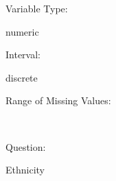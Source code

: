 \documentclass[
]{article}
\begin{document}
\begin{minipage}[t]{0.3\linewidth}

Variable Type:

\end{minipage}%
\begin{minipage}[t]{0.7\linewidth}

numeric

\end{minipage}

\begin{minipage}[t]{0.3\linewidth}

Interval:

\end{minipage}%
\begin{minipage}[t]{0.7\linewidth}

discrete

\end{minipage}

\begin{minipage}[t]{0.3\linewidth}

Range of Missing Values:

\end{minipage}%
\begin{minipage}[t]{0.7\linewidth}

~

\end{minipage}

\begin{minipage}[t]{0.3\linewidth}

Question:

\end{minipage}%
\begin{minipage}[t]{0.7\linewidth}

Ethnicity

\end{minipage}
\end{document}
